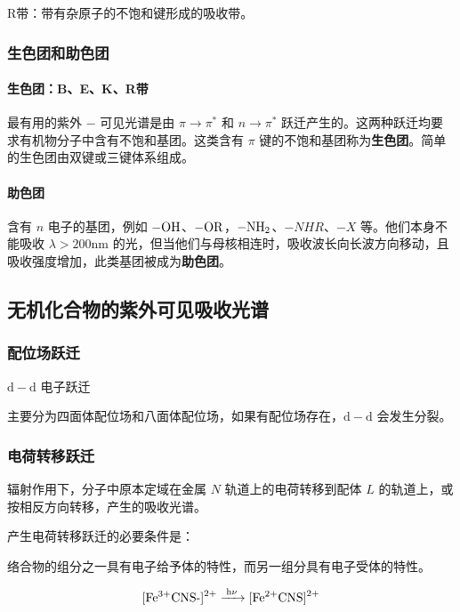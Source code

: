 R带：带有杂原子的不饱和键形成的吸收带。

\subsubsection{生色团和助色团}

\paragraph{生色团：B、E、K、R带}

最有用的紫外 $-$ 可见光谱是由 $\pi \rightarrow \pi^*$ 和 $n \rightarrow \pi^*$ 跃迁产生的。这两种跃迁均要求有机物分子中含有不饱和基团。这类含有 $\pi$ 键的不饱和基团称为\textbf{生色团}。简单的生色团由双键或三键体系组成。

\paragraph{助色团}

含有 $n$ 电子的基团，例如 $\ce{-OH}$、$\ce{-OR}$，$\ce{-NH2}$、$-NHR$、$-X$ 等。他们本身不能吸收 $\lambda > 200 \mathrm{nm}$ 的光，但当他们与母核相连时，吸收波长向长波方向移动，且吸收强度增加，此类基团被成为\textbf{助色团}。

\subsection{无机化合物的紫外可见吸收光谱}

\subsubsection{配位场跃迁}

$\mathrm{d} - \mathrm{d}$ 电子跃迁

主要分为四面体配位场和八面体配位场，如果有配位场存在，$\mathrm{d} - \mathrm{d}$ 会发生分裂。

\subsubsection{电荷转移跃迁}

辐射作用下，分子中原本定域在金属 $N$ 轨道上的电荷转移到配体 $L$ 的轨道上，或按相反方向转移，产生的吸收光谱。

产生电荷转移跃迁的必要条件是：

络合物的组分之一具有电子给予体的特性，而另一组分具有电子受体的特性。

\begin{equation}
    \ce{{[Fe^{3+}CNS-]}^{2+} ->[h\nu] {[Fe^{2+}CNS]}^{2+}}
\end{equation}

